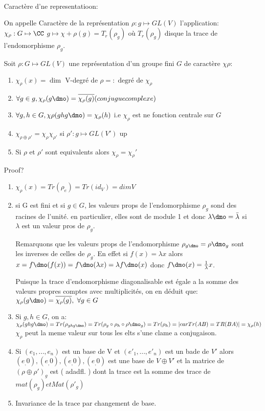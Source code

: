 Caractère d'ne representatioon:
\begin{definition}
	On appelle Caractère de la représentation $\rho:g\mapsto GL(V)$ l'application: $\chi_\rho:G\mapsto  \CC$ $g\mapsto \chi+\rho(g)=T_r(\rho_g)$ où $T_r(\rho_g)$ disque la trace de l'endomorphisme $\rho_g$.
\end{definition}

\begin{proposition}
	Soit $\rho:G\mapsto GL(V)$ une représentation d'un groupe fini $G$ de caractère $\chi\rho$:
	\begin{enumerate}
		\item $\chi_\rho(x)=\dim$ V-degré de $\rho=:\text{ degré de }\chi_\rho$
		\item $\forall g\in g, \chi_\rho(g\dmo)=\overline{\chi_\rho(g)} (conjugue complexe)$
		\item $\forall g,h\in G, \chi\rho(ghg\dmo)=\chi_\rho(h)$ i.e $\chi_\rho$ est ne fonction centrale sur $G$
		\item $\chi_{\rho\oplus\rho'}=\chi_\rho \chi_{\rho'}$ si $\rho':g\mapsto GL(V')$ up
		\item Si $\rho$ et $\rho'$ sont equivalents alors $\chi_\rho=\chi_\rho'$
	\end{enumerate}
\end{proposition}

Proof?
\begin{enumerate}
	\item $\chi_\rho(x)=Tr(\rho_e)=Tr(id_V)=dimV$
	\item si G est fini et si $g\in G$, les valeurs props de l'endomorphisme $\rho_g$ sond des racines de l'unité. en particulier, elles sont de module 1 et donc $\lambda\dmo=\bar \lambda $ si $\lambda$ est un valeur pros de $\rho_g$.
	
	Remarquons que les valeurs props de l'endomorphisme $\rho_{g\dmo}=\rho\dmo_g$ sont les inverses de celles de $\rho_g$. En effet si $f(x)=\lambda x$ alors $x=f\dmo(f(x))=f\dmo(\lambda x)= \lambda f\dmo(x)$ donc $f\dmo(x)=\frac 1\lambda x$.
	
	Puisque la trace d'endomorphisme diagonalisable est égale a la somme des valeurs propres comptes avec multiplicités, on en déduit que:
	$\chi_\rho(g\dmo)=\overline{\chi_\rho(g)},\ \forall g\in G$
	\item Si $g,h\in G$, on a: $\chi_\rho(ghg\dmo)=Tr(\rho_{ghg\dmo})=Tr(\rho_g\circ\rho_h\circ\rho\dmo_g)=Tr(\rho_h)=| car Tr(AB)=TR(BA)|=\chi_\rho(h)$
	$\chi_\rho$ peut la meme valeur sur tous les elts s'une clame a conjugaison.
	\item Si $(e_1,...,e_n)$ est un base de V et $(e'_1,...,e'_n)$ est un bade de $V'$ alors
	$(e_ ,0), (e_ ,0), (e_ ,0), (e_ ,0)$ est une base de $V\oplus V'$ et la matrice de $(\rho\oplus \rho')_g $ est (  adadfl. ) dont la trace est la somme des trace de $mat(\rho_g) et Mat(\rho'_g)$
	\item Invariance de la trace par changement de base.
\end{enumerate}

